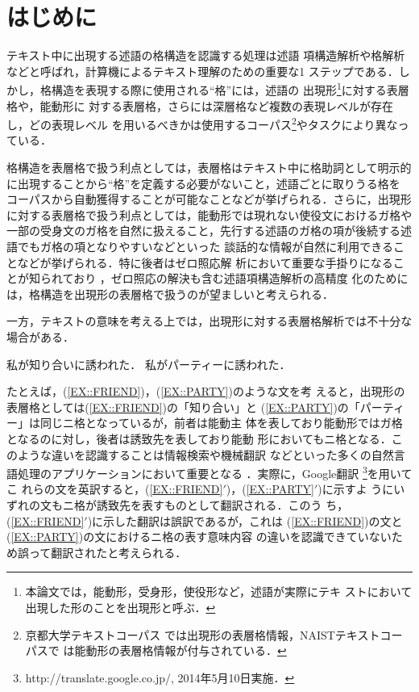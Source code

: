 \documentclass[japanese]{jnlp_1.4}
\begin{document}
\maketitle

 \section{はじめに}
 \label{SEC::INTRO} 

テキスト中に出現する述語の格構造を認識する処理は述語
 項構造解析や格解析などと呼ばれ，計算機によるテキスト理解のための重要な1
 ステップである．しかし，格構造を表現する際に使用される``格''には，述語の
 出現形\footnote{本論文では，能動形，受身形，使役形など，述語が実際にテキ
 ストにおいて出現した形のことを出現形と呼ぶ．}に対する表層格や，能動形に
 対する表層格，さらには深層格など複数の表現レベルが存在し，どの表現レベル
 を用いるべきかは使用するコーパス\footnote{京都大学テキストコーパス
 \cite{TAG}では出現形の表層格情報，NAISTテキストコーパス\cite{Iida2007}で
 は能動形の表層格情報が付与されている．}やタスクにより異なっている．

 格構造を表層格で扱う利点としては，表層格はテキスト中に格助詞として明示的
 に出現することから``格''を定義する必要がないこと，述語ごとに取りうる格を
 コーパスから自動獲得することが可能なことなどが挙げられる．さらに，出現形
 に対する表層格で扱う利点としては，能動形では現れない使役文におけるガ格や
 一部の受身文のガ格を自然に扱えること，先行する述語のガ格の項が後続する述
 語でもガ格の項となりやすい\cite{Kameyama1986s,Nariyama2002s}などといった
 談話的な情報が自然に利用できることなどが挙げられる．特に後者はゼロ照応解
 析において重要な手掛りになることが知られており
 \cite{Iida2007T,Sasano2011}，ゼロ照応の解決も含む述語項構造解析の高精度
 化のためには，格構造を出現形の表層格で扱うのが望ましいと考えられる．

 一方，テキストの意味を考える上では，出現形に対する表層格解析では不十分な
 場合がある．
\begin{exe}
 \ex\label{EX::FRIEND} 私が知り合いに誘われた．
 \ex\label{EX::PARTY} 私がパーティーに誘われた．
\end{exe}
たとえば，(\ref{EX::FRIEND})，(\ref{EX::PARTY})のような文を考
 えると，出現形の表層格としては(\ref{EX::FRIEND})の「知り合い」と
 (\ref{EX::PARTY})の「パーティー」は同じニ格となっているが，前者は能動主
 体を表しており能動形ではガ格となるのに対し，後者は誘致先を表しており能動
 形においてもニ格となる．このような違いを認識することは情報検索や機械翻訳
 などといった多くの自然言語処理のアプリケーションにおいて重要となる
 \cite{Iida2007}．実際に，Google翻訳
 \footnote{http://translate.google.co.jp/, 2014年5月10日実施．}を用いてこ
 れらの文を英訳すると，(\ref{EX::FRIEND}$'$)，(\ref{EX::PARTY}$'$)に示すよ
 うにいずれの文もニ格が誘致先を表すものとして翻訳される．このう
 ち，(\ref{EX::FRIEND}$'$)に示した翻訳は誤訳であるが，これは
 (\ref{EX::FRIEND})の文と(\ref{EX::PARTY})の文におけるニ格の表す意味内容
 の違いを認識できていないため誤って翻訳されたと考えられる．
\end{document}
